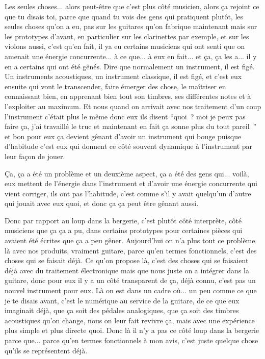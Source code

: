 Les seules choses... alors peut-être que c'est plus côté musicien, alors ça rejoint ce que tu disais toi, parce que quand tu vois des gens qui pratiquent plutôt, les seules choses qu'on a eu, pas sur les guitares qu'on fabrique maintenant mais sur les prototypes d'avant, en particulier sur les clarinettes par exemple, et sur les violons aussi, c'est qu'en fait, il ya eu certains musiciens qui ont senti que on amenait une énergie concurrente... à ce que... à eux en fait... et ça, ça les a...  il y en a certains qui ont été gênés. Dire que normalement un instrument, il est figé. Un  instruments acoustiques, un instrument classique, il est figé, et c'est eux ensuite qui vont le transcender, faire émerger des chose, le maîtriser en connaissant bien, en apprenant bien tout son timbres, ses différentes notes et à l'exploiter au maximum. Et nous quand on arrivait avec nos traitement d'un coup l'instrument c'était plus le même donc eux ils disent “quoi ? moi je peux pas faire ça, j'ai travaillé le truc et maintenant en fait ça sonne plus du tout pareil ” et bon pour eux ça devient gênant d'avoir un instrument qui bouge  puisque d'habitude c'est eux qui donnent ce côté souvent dynamique à l'instrument par leur façon de jouer. 

Ça, ça a été un problème et un deuxième aspect, ça a été des gens qui... voilà, eux mettent de l'énergie dans l'instrument et d'avoir une énergie concurrente qui vient corriger, ils ont pas l'habitude, c'est comme s'il y avait quelqu'un d'autre qui jouait avec eux quoi, et donc ça ça peut être gênant aussi. 

Donc par rapport au loup dans la bergerie, c'est plutôt côté interprète, côté musiciens que ça ça a pu, dans certains prototypes pour certaines pièces qui avaient été écrites que ça a peu gêner. 
Aujourd'hui on n'a plus tout ce problème là avec nos produits, vraiment guitare, parce qu'en termes fonctionnels, c'est des choses qui se faisait déjà. Ce qu'on propose là, c'est des choses qui se faisaient déjà avec du traitement électronique mais que nous juste on a intégrer dans la guitare, donc pour eux il y a un côté transparent de ça, déjà connu, c'est pas un nouvel instrument pour eux. Là on est dans un cadre où... un peu comme ce que je te disais avant, c'est le numérique au service de la guitare, de ce que eux imaginait déjà, que ça soit des pédales analogiques, que ça soit des timbres acoustiques qu'on change, nous on leur fait revivre ça, mais avec une expérience plus simple et plus directe quoi. 
Donc là il n'y a pas ce côté loup dans la bergerie parce que... parce qu'en termes fonctionnels à mon avis, c'est juste quelque chose qu'ils se représentent déjà. 


